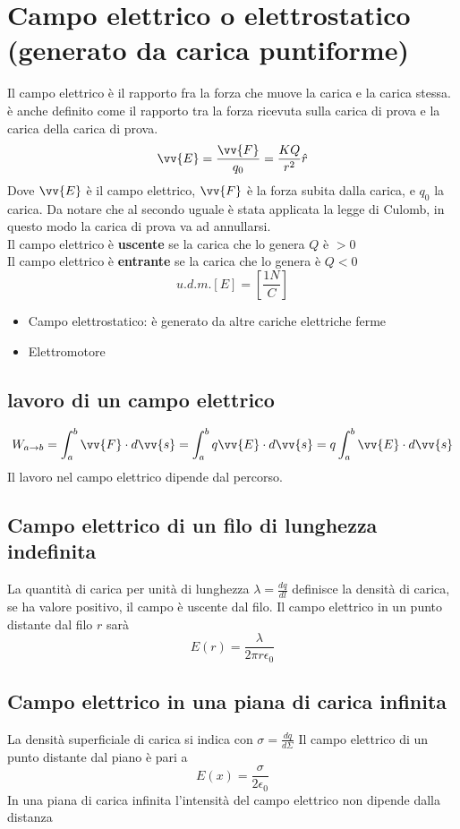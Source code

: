 \documentclass[a4paper]{report}
\begin{document}
  \section{Campo elettrico o elettrostatico (generato da carica puntiforme)}
  Il campo elettrico è il rapporto fra la forza che muove la carica e la carica stessa. è anche definito come il rapporto tra la forza ricevuta sulla carica di prova e la carica della carica di prova.
  $$\vv{E} = \frac{\vv{F}}{q_0} = \frac{K Q}{r^2} \hat{r}$$
  Dove $\vv{E}$ è il campo elettrico, $\vv{F}$ è la forza subita dalla carica, e $q_0$ la carica. Da notare che al secondo uguale è stata applicata la legge di Culomb, in questo modo la carica di prova va ad annullarsi.\\
  Il campo elettrico è \textbf{uscente} se la carica che lo genera $Q$ è $>0$\\
  Il campo elettrico è \textbf{entrante} se la carica che lo genera è $Q<0$
  $$ u.d.m.[E] = [\frac{1N}{C}]$$

  \begin{itemize}
    \item Campo elettrostatico: è generato da altre cariche elettriche ferme
    \item Elettromotore
  \end{itemize}

  \subsection{lavoro di un campo elettrico}
  $$ W_{a \rightarrow b} = \int_a^b \vv{F}\cdot d\vv{s} = \int_a^b q \vv{E} \cdot d\vv{s} = q \int_a^b \vv{E}\cdot d\vv{s} $$
  Il lavoro nel campo elettrico dipende dal percorso.

  \subsection{Campo elettrico di un filo di lunghezza indefinita}
  La quantità di carica per unità di lunghezza $\lambda = \frac{dq}{dl}$ definisce la densità di carica, se ha valore positivo, il campo è uscente dal filo. Il campo elettrico in un punto distante dal filo $r$ sarà
  $$ E(r) = \frac{\lambda}{2\pi r \epsilon_0}$$

  \subsection{Campo elettrico in una piana di carica infinita}
  La densità superficiale di carica si indica con $\sigma = \frac{dq}{d\Sigma}$
  Il campo elettrico di un punto distante dal piano è pari a
  $$E(x) =  \frac{\sigma}{2 \epsilon_0} $$
  In una piana di carica infinita l'intensità del campo elettrico non dipende dalla distanza
\end{document}
